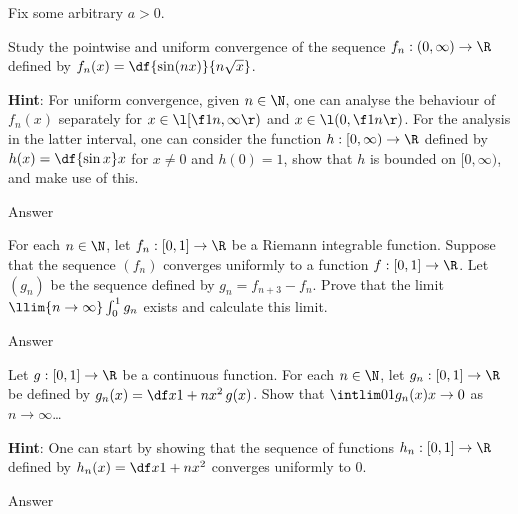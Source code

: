 \documentclass[a4paper]{article}
\begin{document}
Fix some arbitrary $a > 0$.



\begin{questionbody}
Study the pointwise and uniform convergence of the sequence $f_n : (0, \infty) \to \R$ defined by $f_n(x) = \df{\sin(nx)}{n \sqrt x}$.

\textbf{Hint}: For uniform convergence, given $n \in \N$, one can analyse the behaviour of $f_n(x)$ separately for $x \in \l[ \f1n, \infty \r)$ and $x \in \l( 0, \f1n \r)$. For the analysis in the latter interval, one can consider the function $h : [0, \infty) \to \R$ defined by $h(x) = \df{\sin x}x$ for $x \ne 0$ and $h(0) = 1$, show that $h$ is bounded on $[0, \infty)$, and make use of this. %
\end{questionbody}

Answer



\begin{questionbody}
For each $n \in \N$, let $f_n : [0, 1] \to \R$ be a Riemann integrable function. Suppose that the sequence $(f_n)$ converges uniformly to a function $f : [0, 1] \to \R$. Let $(g_n)$ be the sequence defined by $g_n = f_{n+3} - f_n$. Prove that the limit $\llim{n \to \infty} \int_0^1 g_n$ exists and calculate this limit.
\end{questionbody}

Answer



\begin{questionbody}
Let $g : [0, 1] \to \R$ be a continuous function. For each $n \in \N$, let $g_n : [0, 1] \to \R$ be defined by $g_n(x) = \df x{1 + nx^2} \, g(x)$. Show that $\intlim 01 {g_n(x)} x \to 0$ as $n \to \infty$\dots

\textbf{Hint}: One can start by showing that the sequence of functions $h_n : [0, 1] \to \R$ defined by $h_n(x) = \df x{1 + nx^2}$ converges uniformly to 0.
\end{questionbody}

Answer

\end{document}
